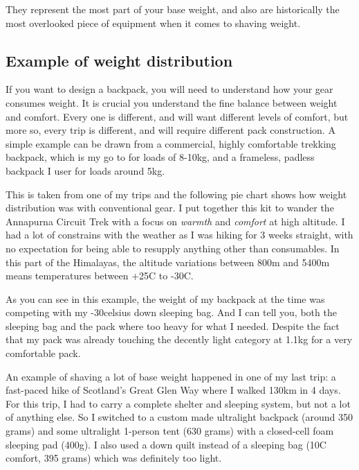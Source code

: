 They represent the most part of your base weight, and also are historically the most overlooked piece of equipment when it comes to shaving weight.

\subsection{Example of weight distribution}

If you want to design a backpack, you will need to understand how your gear consumes weight. It is crucial you understand the fine balance between weight and comfort. Every one is different, and will want different levels of comfort, but more so, every trip is different, and will require different pack construction. A simple example can be drawn from a commercial, highly comfortable trekking backpack, which is my go to for loads of 8-10kg, and a frameless, padless backpack I user for loads around 5kg.

This is taken from one of my trips and the following pie chart shows how weight distribution was with conventional gear. I put together this kit to wander the Annapurna Circuit Trek with a focus on \textit{warmth} and \textit{comfort} at high altitude. I had a lot of constrains with the weather as I was hiking for 3 weeks straight, with no expectation for being able to resupply anything other than consumables. In this part of the Himalayas, the altitude variations between 800m and 5400m means temperatures between +25\degree C to -30\degree C.



As you can see in this example, the weight of my backpack at the time was competing with my -30\degree celsius down sleeping bag. And I can tell you, both the sleeping bag and the pack where too heavy for what I needed. Despite the fact that my pack was already touching the decently light category at 1.1kg for a very comfortable pack.

An example of shaving a lot of base weight happened in one of my last trip: a fast-paced hike of Scotland's Great Glen Way where I walked 130km in 4 days. For this trip, I had to carry a complete shelter and sleeping system, but not a lot of anything else. So I switched to a custom made ultralight backpack (around 350 grams) and some ultralight 1-person tent (630 grams) with a closed-cell foam sleeping pad (400g). I also used a down quilt instead of a sleeping bag (10\degree C comfort, 395 grams) which was definitely too light.

